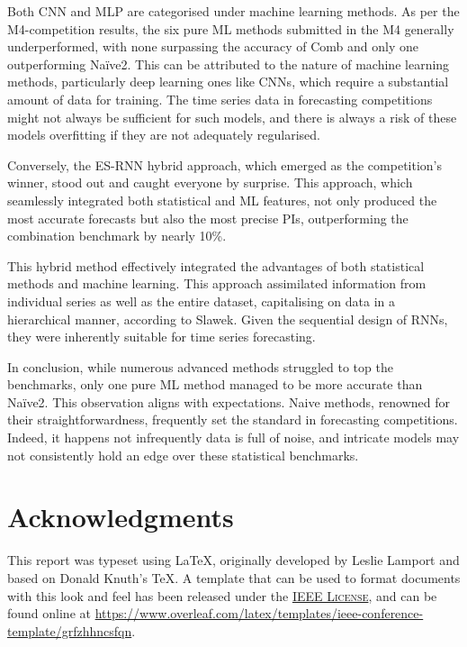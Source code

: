 \documentclass[conference]{IEEEtran}
\begin{document}
Both CNN and MLP are categorised under machine learning methods. As per the M4-competition results\cite{m4-results}, the six pure ML methods submitted in the M4 generally underperformed, with none surpassing the accuracy of Comb and only one outperforming Naïve2. This can be attributed to the nature of machine learning methods, particularly deep learning ones like CNNs, which require a substantial amount of data for training. The time series data in forecasting competitions might not always be sufficient for such models, and there is always a risk of these models overfitting if they are not adequately regularised.

Conversely, the ES-RNN hybrid approach, which emerged as the competition's winner, stood out and caught everyone by surprise. This approach, which seamlessly integrated both statistical and ML features, not only produced the most accurate forecasts but also the most precise PIs, outperforming the combination benchmark by nearly 10\%.

This hybrid method effectively integrated the advantages of both statistical methods and machine learning. This approach assimilated information from individual series as well as the entire dataset, capitalising on data in a hierarchical manner, according to Slawek\cite{slawek}. Given the sequential design of RNNs, they were inherently suitable for time series forecasting.

In conclusion, while numerous advanced methods struggled to top the benchmarks, only one pure ML method managed to be more accurate than Naïve2. This observation aligns with expectations. Naive methods, renowned for their straightforwardness, frequently set the standard in forecasting competitions. Indeed, it happens not infrequently data is full of noise, and intricate models may not consistently hold an edge over these statistical benchmarks.


\section*{Acknowledgments}

This report was typeset using \LaTeX, originally developed by Leslie Lamport and based on Donald Knuth's \TeX. A template that can be used to format documents with this look and feel has been released under the \href{https://www.ieee.org/publications/subscriptions/info/licensing.html}{\textsc{IEEE License}}, and can be found online at \url{https://www.overleaf.com/latex/templates/ieee-conference-template/grfzhhncsfqn}.
\end{document}
